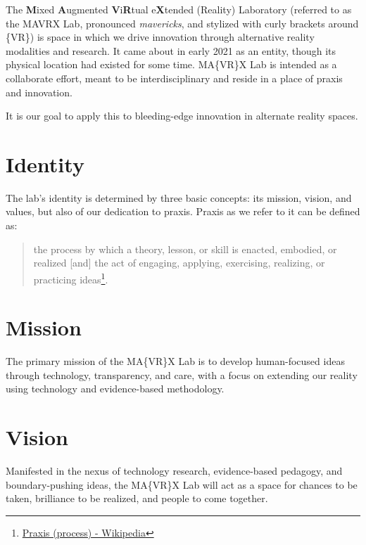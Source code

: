 \documentclass[
]{book}
\begin{document}
The \textbf{M}ixed \textbf{A}ugmented \textbf{V}i\textbf{R}tual e\textbf{X}tended (Reality) Laboratory (referred to as the MAVRX Lab, pronounced \emph{mavericks}, and stylized with curly brackets around \{VR\}) is space in which we drive innovation through alternative reality modalities and research. It came about in early 2021 as an entity, though its physical location had existed for some time. MA\{VR\}X Lab is intended as a collaborate effort, meant to be interdisciplinary and reside in a place of praxis and innovation.

It is our goal to apply this to bleeding-edge innovation in alternate reality spaces.

\hypertarget{identity}{%
\section*{Identity}\label{identity}}

The lab's identity is determined by three basic concepts: its mission, vision, and values, but also of our dedication to praxis. Praxis as we refer to it can be defined as:

\begin{quote}
the process by which a theory, lesson, or skill is enacted, embodied, or realized {[}and{]} the act of engaging, applying, exercising, realizing, or practicing ideas\footnote{\href{https://en.wikipedia.org/wiki/Praxis_(process)}{Praxis (process) - Wikipedia}}.
\end{quote}

\hypertarget{mission}{%
\section*{Mission}\label{mission}}

The primary mission of the MA\{VR\}X Lab is to develop human-focused ideas through technology, transparency, and care, with a focus on extending our reality using technology and evidence-based methodology.

\hypertarget{vision}{%
\section*{Vision}\label{vision}}

Manifested in the nexus of technology research, evidence-based pedagogy, and boundary-pushing ideas, the MA\{VR\}X Lab will act as a space for chances to be taken, brilliance to be realized, and people to come together.
\end{document}
